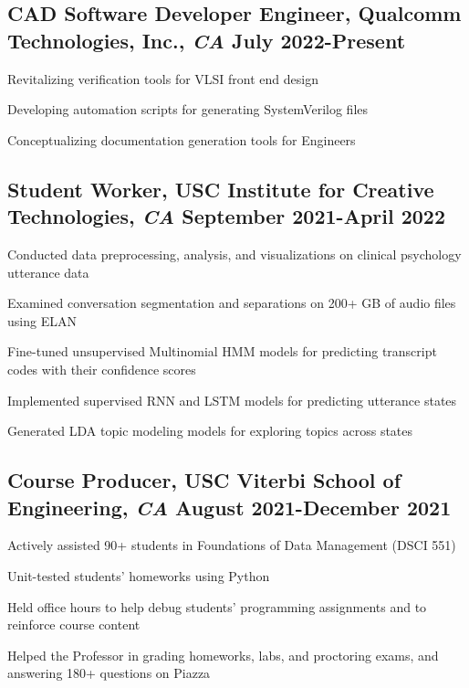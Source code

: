 \documentclass[11pt]{article}
\begin{document}
\subsection*{CAD Software Developer Engineer{\normalfont, Qualcomm Technologies, Inc.,
            \textit{CA} \hfill
            July 2022-Present}}
\begin{compactitem}
    \item Revitalizing verification tools for VLSI front end design
    \item Developing automation scripts for generating SystemVerilog files
    \item Conceptualizing documentation generation tools for Engineers
\end{compactitem}

\subsection*{Student Worker{\normalfont, USC Institute for Creative
            Technologies,
            \textit{CA} \hfill
            September 2021-April 2022}}
\begin{compactitem}
    \item Conducted data preprocessing, analysis, and visualizations on clinical psychology utterance data
    \item Examined conversation segmentation and separations on 200+ GB of audio files using ELAN
    \item Fine-tuned unsupervised Multinomial HMM models for predicting transcript codes with their confidence scores
    \item Implemented supervised RNN and LSTM models for predicting utterance states
    \item Generated LDA topic modeling models for exploring topics across states
\end{compactitem}

\subsection*{Course Producer{\normalfont, USC Viterbi School of Engineering,
            \textit{CA} \hfill
            August 2021-December 2021}}
\begin{compactitem}
    \item Actively assisted 90+ students in Foundations of Data Management
    (DSCI 551)
    \item Unit-tested students' homeworks using Python
    \item Held office hours to help debug students' programming assignments
    and to reinforce
    course content
    \item Helped the Professor in grading homeworks, labs, and proctoring exams, and
    answering 180+ questions on Piazza
\end{compactitem}
\end{document}
